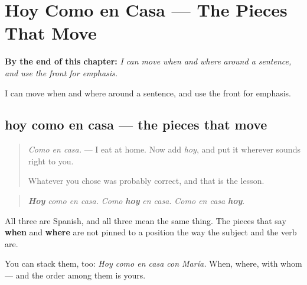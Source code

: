 
\chapter{Hoy Como en Casa --- The Pieces That Move}
\label{ch:hoy-como}

\begin{chapteropening}
\textbf{By the end of this chapter:} \emph{I can move when and where around a sentence, and use the front for emphasis.}

I can move when and where around a sentence, and use the front for emphasis.
\end{chapteropening}

\section[hoy como en casa]{hoy como en casa — the pieces that move}

\label{lesson:ES-C67-hoy-como-en-casa}



\begin{quote}
\emph{Como en casa.} — I eat at home. Now add \emph{hoy}, and put it wherever sounds right to you.

Whatever you chose was probably correct, and that is the lesson.
\end{quote}

\begin{grammarlens}[title={Grammar Lens: three placements, one meaning}]
\begin{quote}
\emph{\textbf{Hoy}} \emph{como en casa.} \emph{Como} \emph{\textbf{hoy}} \emph{en casa.} \emph{Como en casa} \emph{\textbf{hoy}}.
\end{quote}

All three are Spanish, and all three mean the same thing. The pieces that say \textbf{when} and \textbf{where} are not pinned to a position the way the subject and the verb are.

You can stack them, too: \emph{Hoy como en casa con María.} When, where, with whom — and the order among them is yours.
\end{grammarlens}

